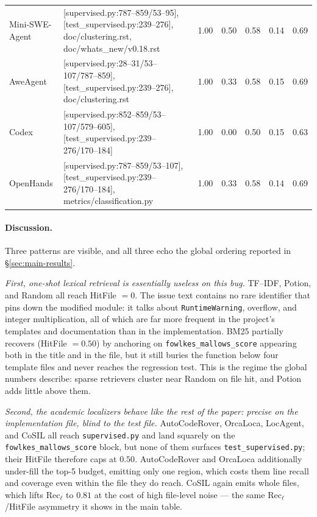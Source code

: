 \begin{table}[h]
\begin{tabular}{l p{6.6cm} ccccc}
Mini-SWE-Agent & [supervised.py:787--859/53--95], [test\_supervised.py:239--276], doc/clustering.rst, doc/whats\_new/v0.18.rst                  & 1.00 & 0.50 & 0.58 & 0.14 & 0.69 \\
AweAgent       & [supervised.py:28--31/53--107/787--859], [test\_supervised.py:239--276], doc/clustering.rst                                    & 1.00 & 0.33 & 0.58 & 0.15 & 0.69 \\
Codex          & [supervised.py:852--859/53--107/579--605], [test\_supervised.py:239--276/170--184]                                             & 1.00 & 0.00 & 0.50 & 0.15 & 0.63 \\
OpenHands      & [supervised.py:787--859/53--107], [test\_supervised.py:239--276/170--184], metrics/classification.py                            & 1.00 & 0.33 & 0.58 & 0.14 & 0.69 \\
\bottomrule
\end{tabular}
\end{table}

\paragraph{Discussion.}
Three patterns are visible, and all three echo the global ordering reported in \S\ref{sec:main-results}.

\emph{First, one-shot lexical retrieval is essentially useless on this bug.}
TF--IDF, Potion, and Random all reach HitFile $=0$. The issue text contains no rare identifier that pins down the modified module: it talks about \texttt{RuntimeWarning}, overflow, and integer multiplication, all of which are far more frequent in the project's templates and documentation than in the implementation. BM25 partially recovers (HitFile $=0.50$) by anchoring on \texttt{fowlkes\_mallows\_score} appearing both in the title and in the file, but it still buries the function below four template files and never reaches the regression test. This is the regime the global numbers describe: sparse retrievers cluster near Random on file hit, and Potion adds little above them.

\emph{Second, the academic localizers behave like the rest of the paper: precise on the implementation file, blind to the test file.}
AutoCodeRover, OrcaLoca, LocAgent, and CoSIL all reach \texttt{supervised.py} and land squarely on the \texttt{fowlkes\_mallows\_score} block, but none of them surfaces \texttt{test\_supervised.py}; their HitFile therefore caps at $0.50$. AutoCodeRover and OrcaLoca additionally under-fill the top-5 budget, emitting only one region, which costs them line recall and coverage even within the file they do reach. CoSIL again emits whole files, which lifts Rec$_\ell$ to $0.81$ at the cost of high file-level noise --- the same Rec$_\ell$/HitFile asymmetry it shows in the main table.

